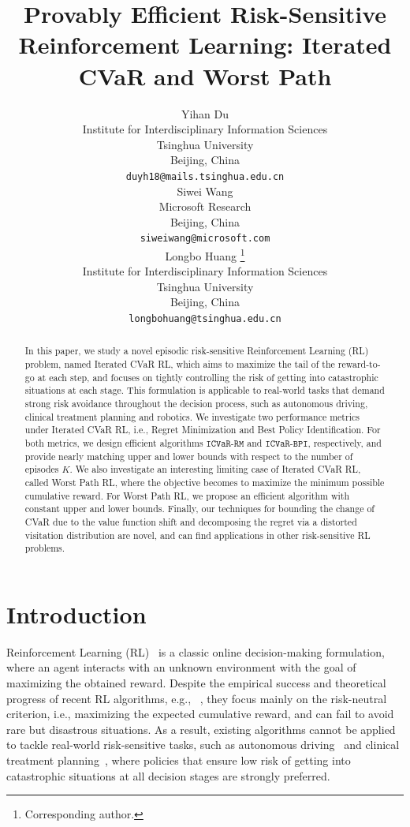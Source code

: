 \documentclass{article} %
\title{Provably Efficient Risk-Sensitive Reinforcement Learning: Iterated CVaR and Worst Path}
\author{Yihan Du\\
	Institute for Interdisciplinary Information Sciences\\
	Tsinghua University\\
	Beijing, China \\
	\texttt{duyh18@mails.tsinghua.edu.cn} \\
	\And
	Siwei Wang \\
	Microsoft Research \\
	Beijing, China \\
	\texttt{siweiwang@microsoft.com} \\
	\AND
	Longbo Huang \thanks{Corresponding author.} \\
	Institute for Interdisciplinary Information Sciences \\
	Tsinghua University\\
	Beijing, China \\
	\texttt{longbohuang@tsinghua.edu.cn}
}
\newcommand{\algcvar}{\mathtt{ICVaR\mbox{-}RM}}
\newcommand{\algcvarbpi}{\mathtt{ICVaR\mbox{-}BPI}}
\newcommand{\longbo}[1]{}
\newcommand{\yihan}[1]{}
\newcommand{\longbo}[1]{{\color{red}  [\text{Longbo:} #1]}}
\newcommand{\yihan}[1]{{\color{teal} [\text{Yihan:} #1]}}
\begin{document}
	
	
	\maketitle
	
	\begin{abstract}
		In this paper, we study a novel episodic risk-sensitive Reinforcement Learning (RL) problem, named Iterated CVaR RL, which aims to maximize the tail of the reward-to-go at each step, and focuses on tightly controlling the risk of getting into catastrophic situations at each stage. 
		This formulation is applicable to real-world tasks that demand strong risk avoidance throughout the decision process, such as autonomous driving, clinical treatment planning and robotics. 
		We investigate two performance metrics under Iterated CVaR RL, i.e., Regret Minimization  and Best Policy Identification. For both metrics, we design efficient algorithms $\algcvar$ and $\algcvarbpi$, respectively, and provide nearly matching upper and lower bounds with respect to the number of episodes $K$. 
		We also investigate an interesting limiting case of Iterated CVaR RL, called Worst Path RL, where the objective becomes to maximize the minimum possible cumulative reward. For Worst Path RL, we propose an efficient algorithm with constant upper and lower bounds. 
		Finally, our techniques for bounding the change of CVaR due to the value function shift and decomposing the regret via a distorted visitation distribution are novel, and can find applications in other risk-sensitive RL problems. 
	\end{abstract}
	
	
	\section{Introduction}
	Reinforcement Learning (RL)~\citep{kaelbling1996reinforcement,szepesvari2010algorithms,sutton2018reinforcement} is a classic online decision-making formulation, where an agent interacts with an unknown environment with the goal of maximizing the obtained reward. 
	Despite the empirical success and theoretical progress of recent RL algorithms, e.g., ~\citep{szepesvari2010algorithms,agrawal2017optimistic,azar2017minimax,zanette2019tighter}, they focus mainly on the risk-neutral criterion, i.e., maximizing the expected cumulative reward, and can fail to avoid rare but disastrous situations. %
	As a result, existing algorithms cannot be applied to tackle real-world risk-sensitive tasks, such as autonomous driving~\citep{wen2020safe} and clinical treatment planning~\citep{healthcare}, where 
	policies that ensure low risk of getting into catastrophic situations
	at all decision stages are strongly preferred. 
	
\end{document}
